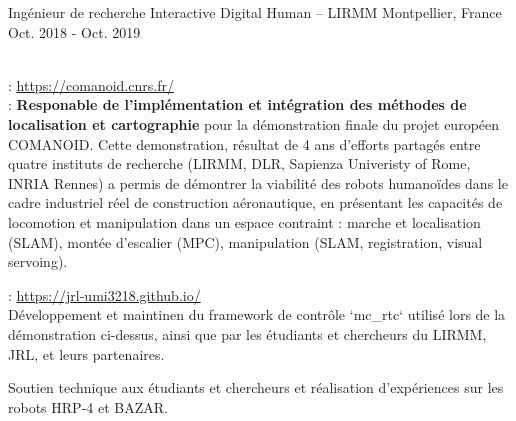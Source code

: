 \begin{cventries}
  \cventry
    {Ingénieur de recherche} %
    {Interactive Digital Human -- LIRMM} %
    {Montpellier, France} %
    {Oct. 2018 - Oct. 2019} %
    {
      \begin{cvitems} %
        \item {}\\
          : \url{https://comanoid.cnrs.fr/}\\
          : \textbf{Responable de l'implémentation et intégration des méthodes de localisation et cartographie} pour la démonstration finale du projet européen COMANOID. Cette demonstration, résultat de 4 ans d'efforts partagés entre quatre instituts de recherche (LIRMM, DLR, Sapienza Univeristy of Rome, INRIA Rennes) a permis de démontrer la viabilité des robots humanoïdes dans le cadre industriel réel de construction aéronautique, en présentant les capacités de locomotion et manipulation dans un espace contraint : marche et localisation (SLAM), montée d’escalier (MPC), manipulation (SLAM, registration, visual servoing).
        \item {}: \url{https://jrl-umi3218.github.io/}\\
        Développement et maintinen du framework de contrôle `mc\_rtc` utilisé lors de la démonstration ci-dessus, ainsi que par les étudiants et chercheurs du LIRMM, JRL, et leurs partenaires.
        \item Soutien technique aux étudiants et chercheurs et réalisation d'expériences sur les robots HRP-4 et BAZAR.
      \end{cvitems}
    }


\end{cventries}
